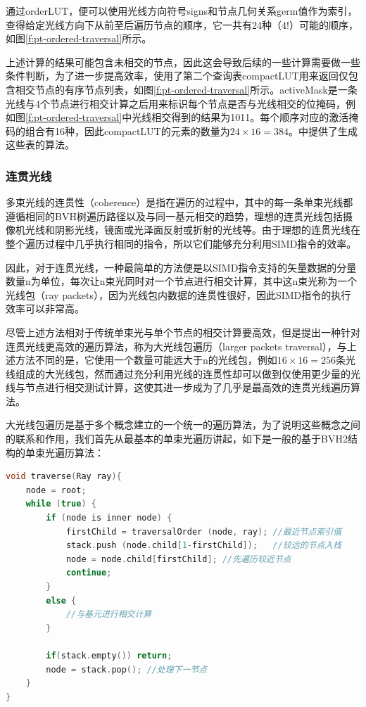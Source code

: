 通过orderLUT，便可以使用光线方向符号signs和节点几何关系germ值作为索引，查得给定光线方向下从前至后遍历节点的顺序，它一共有24种（$4!$）可能的顺序，如图\ref{f:pt-ordered-traversal}所示。

上述计算的结果可能包含未相交的节点，因此这会导致后续的一些计算需要做一些条件判断，为了进一步提高效率，\cite{a:EfficientRayTracingKernelsforModernCPUArchitectures}使用了第二个查询表compactLUT用来返回仅包含相交节点的有序节点列表，如图\ref{f:pt-ordered-traversal}所示。activeMask是一条光线与4个节点进行相交计算之后用来标识每个节点是否与光线相交的位掩码，例如图\ref{f:pt-ordered-traversal}中光线相交得到的结果为1011。每个顺序对应的激活掩码的组合有16种，因此compactLUT的元素的数量为$24\times 16=384$。\cite{a:EfficientRayTracingKernelsforModernCPUArchitectures}中提供了生成这些表的算法。






\subsubsection{连贯光线}\label{sec:coherent-ray-tracing}
多束光线的连贯性（coherence）是指在遍历的过程中，其中的每一条单束光线都遵循相同的BVH树遍历路径以及与同一基元相交的趋势，理想的连贯光线包括摄像机光线和阴影光线，镜面或光泽面反射或折射的光线等。由于理想的连贯光线在整个遍历过程中几乎执行相同的指令，所以它们能够充分利用SIMD指令的效率。

因此，对于连贯光线，一种最简单的方法便是以SIMD指令支持的矢量数据的分量数量n为单位，每次让n束光同时对一个节点进行相交计算，其中这n束光称为一个光线包（ray packets），因为光线包内数据的连贯性很好，因此SIMD指令的执行效率可以非常高。

尽管上述方法相对于传统单束光与单个节点的相交计算要高效，但是\cite{a:RayTracingDeformableScenesUsingDynamicBoundingVolumeHierarchies}提出一种针对连贯光线更高效的遍历算法，称为大光线包遍历（larger packets traversal），与上述方法不同的是，它使用一个数量可能远大于n的光线包，例如$16\times 16=256$条光线组成的大光线包，然而通过充分利用光线的连贯性却可以做到仅使用更少量的光线与节点进行相交测试计算，这使其进一步成为了几乎是最高效的连贯光线遍历算法。

大光线包遍历是基于多个概念建立的一个统一的遍历算法，为了说明这些概念之间的联系和作用，我们首先从最基本的单束光遍历讲起，如下是一般的基于BVH2结构的单束光遍历算法：

\begin{lstlisting}[language=C++]
void traverse(Ray ray){
	node = root;
	while (true) {
		if (node is inner node) {
			firstChild = traversalOrder (node, ray); //最近节点索引值
			stack.push (node.child[1-firstChild]);   //较远的节点入栈
			node = node.child[firstChild]; //先遍历较近节点
			continue;
		}
		else {
			//与基元进行相交计算
		}
			
		if(stack.empty()) return;
		node = stack.pop(); //处理下一节点
	}
}
\end{lstlisting}

